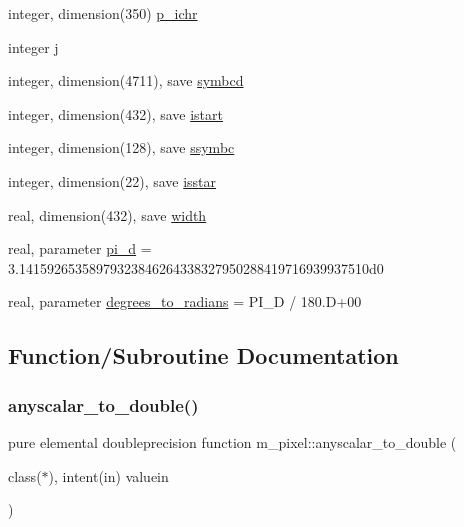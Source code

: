 \begin{DoxyCompactItemize}
integer, dimension(350) \mbox{\hyperlink{namespacem__pixel_a34ef1aad7a3aa45df090b226788a2d2c}{p\+\_\+ichr}}
\item 
integer \mbox{\hyperlink{namespacem__pixel_a1faa00d5ad36016f8c9f4522a2391209}{j}}
\item 
integer, dimension(4711), save \mbox{\hyperlink{namespacem__pixel_a3da3613bd8dfa6a15b7d0aa3db1f9eb5}{symbcd}}
\item 
integer, dimension(432), save \mbox{\hyperlink{namespacem__pixel_af41ef8a6b53ec63db42172fab83ecbfa}{istart}}
\item 
integer, dimension(128), save \mbox{\hyperlink{namespacem__pixel_a2b75d036a498ac0c68380803a0f1d538}{ssymbc}}
\item 
integer, dimension(22), save \mbox{\hyperlink{namespacem__pixel_a6f8d92e6b4c33e62399d3286448b76fa}{isstar}}
\item 
real, dimension(432), save \mbox{\hyperlink{namespacem__pixel_abf266872f93a04af39d2903fb20d2a0d}{width}}
\item 
real, parameter \mbox{\hyperlink{namespacem__pixel_a51ed97a239a2e633db7f4a5cf7e61006}{pi\+\_\+d}} = 3.\+14159265358979323846264338327950288419716939937510d0
\item 
real, parameter \mbox{\hyperlink{namespacem__pixel_ae2cb6913bb1501cb9872cb874a6c283e}{degrees\+\_\+to\+\_\+radians}} = P\+I\+\_\+D / 180.\+D+00
\end{DoxyCompactItemize}


\subsection{Function/\+Subroutine Documentation}
\mbox{\label{namespacem__pixel_a18d90bca3489d1280c4326e51b5cb7b3}} 
\subsubsection{\texorpdfstring{anyscalar\+\_\+to\+\_\+double()}{anyscalar\_to\_double()}}
{\footnotesize\ttfamily pure elemental doubleprecision function m\+\_\+pixel\+::anyscalar\+\_\+to\+\_\+double (\begin{DoxyParamCaption}\item[{class($\ast$), intent(in)}]{valuein }\end{DoxyParamCaption})\hspace{0.3cm}{\ttfamily [private]}}

